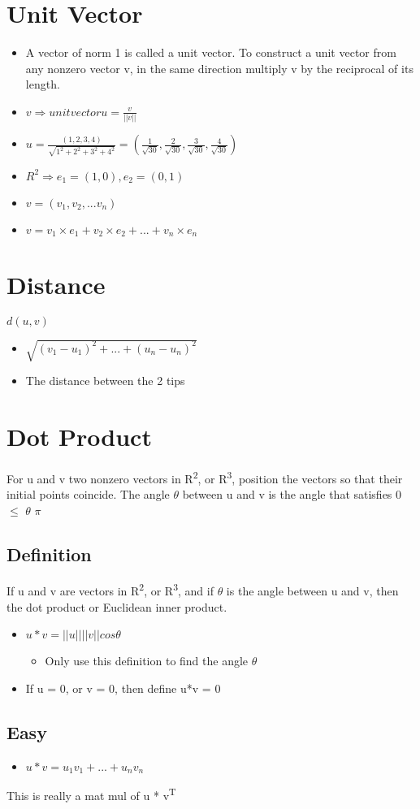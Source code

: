 \documentclass[11pt]{article}
\begin{document}
\section{Unit Vector}
\label{sec:orge3bda62}
\begin{itemize}
\item A vector of norm 1 is called a unit vector. To construct a unit vector from any nonzero vector v, in the same direction multiply v by the reciprocal of its length.

\item \(v \Rightarrow{} unit vector u = \frac{v}{||v||}\)
\item \(u = \frac{(1,2,3,4)}{\sqrt{1^2 + 2^2 + 3^2 + 4^2}} = (\frac{1}{\sqrt{30}},\frac{2}{\sqrt{30}},\frac{3}{\sqrt{30}},\frac{4}{\sqrt{30}})\)

\item \(R^{2} \Rightarrow{} e_{1} = (1,0), e_{2} = (0,1)\)

\item \(v = (v_{1},v_{2},...v_{n})\)
\item \(v = v_{1}\times{}e_{1} + v_{2}\times{}e_{2} + ... + v_{n}\times{}e_{n}\)
\end{itemize}
\section{Distance}
\label{sec:org0910b36}
\(d(u,v)\)
\begin{itemize}
\item \(\sqrt{(v_{1}-u_{1})^{2} + ... + (u_{n} - u_{n})^{2}}\)
\item The distance between the 2 tips
\end{itemize}
\section{Dot Product}
\label{sec:orgc14cd66}
For u and v two nonzero vectors in R\textsuperscript{2}, or R\textsuperscript{3}, position the vectors so that their initial points coincide. The angle \(\theta\) between u and v is the angle that satisfies 0 \(\le\) \(\theta\) \(\pi\)
\subsection{Definition}
\label{sec:org2102741}
If u and v are vectors in R\textsuperscript{2}, or R\textsuperscript{3}, and if \(\theta\) is the angle between u and v, then the dot product or Euclidean inner product.
\begin{itemize}
\item \(u * v = ||u||||v||cos\theta{}\)
\begin{itemize}
\item Only use this definition to find the angle \(\theta\)
\end{itemize}
\item If u = 0, or v = 0, then define u*v = 0
\end{itemize}
\subsection{Easy}
\label{sec:org315c60a}
\begin{itemize}
\item \(u*v = u_{1}v_{1} + ... + u_{n}v_{n}\)
\end{itemize}
This is really a mat mul of u * v\textsuperscript{T}
\end{document}
